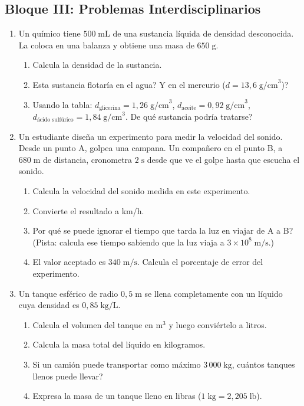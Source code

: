 \documentclass[12pt, letterpaper]{article}
\begin{document}
\subsection{Bloque III: Problemas Interdisciplinarios}

\begin{enumerate}[leftmargin=*, resume]
  \item \medio{} Un químico tiene $500\;\text{mL}$ de una sustancia líquida de densidad desconocida. La coloca en una balanza y obtiene una masa de $650\;\text{g}$.
  \begin{enumerate}[label=\alph*)]
    \item Calcula la densidad de la sustancia.
    \item \textquestiondown Esta sustancia flotaría en el agua? \textquestiondown Y en el mercurio ($d = 13{,}6\;\text{g/cm}^3$)?
    \item Usando la tabla: $d_{\text{glicerina}} = 1{,}26\;\text{g/cm}^3$, $d_{\text{aceite}} = 0{,}92\;\text{g/cm}^3$, $d_{\text{ácido sulfúrico}} = 1{,}84\;\text{g/cm}^3$. \textquestiondown De qué sustancia podría tratarse?
  \end{enumerate}

  \item \dificil{} Un estudiante diseña un experimento para medir la velocidad del sonido. Desde un punto A, golpea una campana. Un compañero en el punto B, a $680\;\text{m}$ de distancia, cronometra $2\;\text{s}$ desde que ve el golpe hasta que escucha el sonido.
  \begin{enumerate}[label=\alph*)]
    \item Calcula la velocidad del sonido medida en este experimento.
    \item Convierte el resultado a km/h.
    \item \textquestiondown Por qué se puede ignorar el tiempo que tarda la luz en viajar de A a B? (Pista: calcula ese tiempo sabiendo que la luz viaja a $3 \times 10^8\;\text{m/s}$.)
    \item El valor aceptado es $340\;\text{m/s}$. Calcula el porcentaje de error del experimento.
  \end{enumerate}

  \item \dificil{} Un tanque esférico de radio $0{,}5\;\text{m}$ se llena completamente con un líquido cuya densidad es $0{,}85\;\text{kg/L}$.
  \begin{enumerate}[label=\alph*)]
    \item Calcula el volumen del tanque en m$^3$ y luego conviértelo a litros.
    \item Calcula la masa total del líquido en kilogramos.
    \item Si un camión puede transportar como máximo $3\,000\;\text{kg}$, \textquestiondown cuántos tanques llenos puede llevar?
    \item Expresa la masa de un tanque lleno en libras ($1\;\text{kg} = 2{,}205\;\text{lb}$).
  \end{enumerate}


\end{enumerate}
\end{document}

